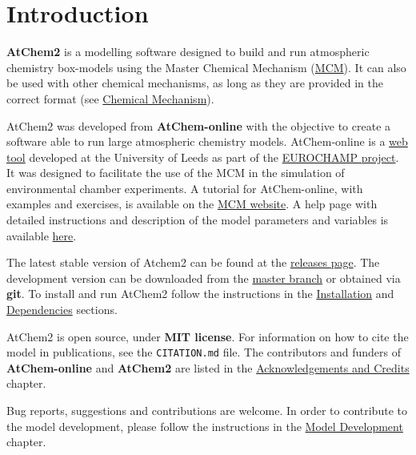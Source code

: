 %
%
%
%
\chapter{Introduction} \label{ch:introduction}

\textbf{AtChem2} is a modelling software designed to build and run
atmospheric chemistry box-models using the Master Chemical Mechanism
(\href{http://mcm.leeds.ac.uk/MCM/}{MCM}). It can also be used with
other chemical mechanisms, as long as they are provided in the correct
format (see \hyperref[sec:mechanism]{Chemical Mechanism}).

AtChem2 was developed from \textbf{AtChem-online} with the objective
to create a software able to run large atmospheric chemistry
models. AtChem-online is a
\href{https://atchem.leeds.ac.uk/webapp/}{web tool} developed at the
University of Leeds as part of the
\href{https://www.eurochamp.org/}{EUROCHAMP project}. It was designed
to facilitate the use of the MCM in the simulation of environmental
chamber experiments. A tutorial for AtChem-online, with examples and
exercises, is available on the
\href{http://mcm.leeds.ac.uk/MCMv3.3.1/atchem/tutorial_intro.htt}{MCM
  website}. A help page with detailed instructions and description of
the model parameters and variables is available
\href{https://atchem.leeds.ac.uk/webapp/run/help.html}{here}.

The latest stable version of Atchem2 can be found at the
\href{https://github.com/AtChem/AtChem2/releases}{releases page}. The
development version can be downloaded from the
\href{https://github.com/AtChem/AtChem2/archive/master.zip}{master
  branch} or obtained via \textbf{git}. To install and run AtChem2
follow the instructions in the \hyperref[sec:install]{Installation}
and \hyperref[sec:dependencies]{Dependencies} sections.

AtChem2 is open source, under \textbf{MIT license}. For information on
how to cite the model in publications, see the \verb|CITATION.md|
file. The contributors and funders of \textbf{AtChem-online} and
\textbf{AtChem2} are listed in the
\hyperref[ch:credits]{Acknowledgements and Credits} chapter.

Bug reports, suggestions and contributions are welcome. In order to
contribute to the model development, please follow the instructions in
the \hyperref[ch:development]{Model Development} chapter.
